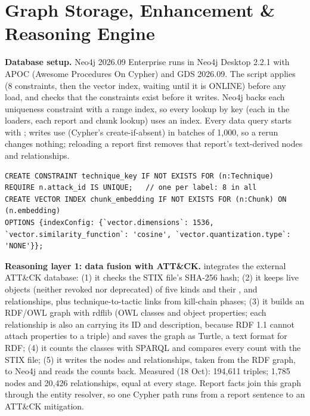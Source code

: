 \documentclass[10pt]{article}
\begin{document}
\section{Graph Storage, Enhancement \& Reasoning Engine}
\textbf{Database setup.} Neo4j 2026.09 Enterprise runs in Neo4j Desktop 2.2.1 with APOC (Awesome Procedures On Cypher) and GDS 2026.09. The script  applies  (8 constraints, then the vector index, waiting until it is ONLINE) before any load, and  checks that the constraints exist before it writes. Neo4j backs each uniqueness constraint with a range index, so every lookup by key (each  in the loaders, each report and chunk lookup) uses an index. Every data query starts with ; writes use  (Cypher's create-if-absent) in batches of 1,000, so a rerun changes nothing; reloading a report first removes that report's text-derived nodes and relationships.
\begin{lstlisting}[language=cypher]
CREATE CONSTRAINT technique_key IF NOT EXISTS FOR (n:Technique) REQUIRE n.attack_id IS UNIQUE;   // one per label: 8 in all
CREATE VECTOR INDEX chunk_embedding IF NOT EXISTS FOR (n:Chunk) ON (n.embedding)
OPTIONS {indexConfig: {`vector.dimensions`: 1536, `vector.similarity_function`: 'cosine', `vector.quantization.type`: 'NONE'}};
\end{lstlisting}

\textbf{Reasoning layer 1: data fusion with ATT\&CK.}  integrates the external ATT\&CK database: (1) it checks the STIX file's SHA-256 hash; (2) it keeps live objects (neither revoked nor deprecated) of five kinds and their ,  and  relationships, plus technique-to-tactic links from kill-chain phases; (3) it builds an RDF/OWL graph with rdflib (OWL classes and object properties; each relationship is also an  carrying its ID and description, because RDF 1.1 cannot attach properties to a triple) and saves the graph as Turtle, a text format for RDF; (4) it counts the classes with SPARQL and compares every count with the STIX file; (5) it writes the nodes and relationships, taken from the RDF graph, to Neo4j and reads the counts back. Measured (18 Oct): 194,611 triples; 1,785 nodes and 20,426 relationships, equal at every stage. Report facts join this graph through the entity resolver, so one Cypher path runs from a report sentence to an ATT\&CK mitigation.
\end{document}
